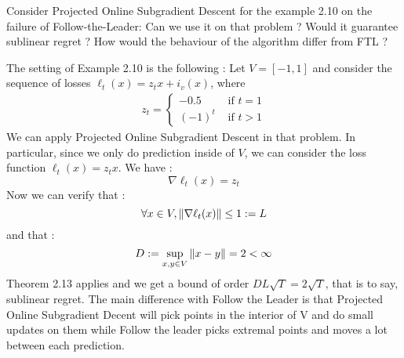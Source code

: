 \begin{exercise}[]{}
	Consider Projected Online Subgradient Descent for the example 2.10 on the failure of Follow-the-Leader: Can we use it on that problem ? Would it guarantee sublinear regret ? How would the behaviour of the algorithm differ from FTL ?
\end{exercise}

\begin{solution}[]
	The setting of Example 2.10 is the following : Let $ V = [-1,1] $ and consider the sequence of losses $ \ell_t(x) = z_tx + i_v(x) $, where 
\begin{align*}
	z_t = 
\begin{cases}
	-0.5 &\text{ if } t=1\\
	(-1)^t &\text{ if } t>1
\end{cases}
\end{align*}
We can apply Projected Online Subgradient Descent in that problem. In particular, since we only do prediction inside of $ V $, we can consider the loss function $ \ell_t(x) = z_t x $. We have :
\begin{equation*}
	\nabla \ell_t(x) = z_t
\end{equation*}
Now we can verify that :
\begin{equation*}
	\forall x \in V, \left\|\nabla  \ell_t(x)\right\| \leq 1:=L
\end{equation*}
and that :
\begin{equation*}
	D := \sup_{x,y\in V}\left\|x-y\right\| = 2 < \infty
\end{equation*}
Theorem 2.13 applies and we get a bound of order $ DL\sqrt{T}= 2\sqrt{T} $, that is to say, sublinear regret. The main difference with Follow the Leader is that Projected Online Subgradient Decent will pick points in the interior of V and do small updates on them while Follow the leader picks extremal points and moves a lot between each prediction.

\end{solution}
